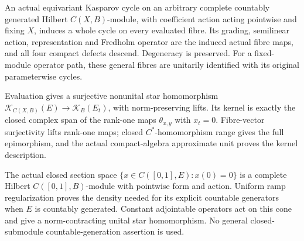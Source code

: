 \begin{proposition}\label{prop:arbitrary-interval-cycle-fibres}
\leanok
An actual equivariant Kasparov cycle on an arbitrary complete countably
generated Hilbert $C(X,B)$-module, with coefficient action acting pointwise
and fixing $X$, induces a whole cycle on every evaluated fibre.
Its grading, semilinear action, representation and Fredholm operator
are the induced actual fibre maps, and all four compact defects descend.
Degeneracy is preserved. For a fixed-module operator path, these general
fibres are unitarily identified with its original parameterwise cycles.
\end{proposition}

\begin{proposition}\label{prop:compact-fibre-epimorphism-and-kernel}
\leanok
Evaluation gives a surjective nonunital star homomorphism
$\mathcal K_{C(X,B)}(E)\to\mathcal K_B(E_t)$, with norm-preserving lifts.
Its kernel is exactly the closed complex span of the rank-one maps
$\theta_{x,y}$ with $x_t=0$. Fibre-vector surjectivity lifts rank-one maps;
closed $C^*$-homomorphism range gives the full epimorphism, and the actual
compact-algebra approximate unit proves the kernel description.
\end{proposition}

\begin{proposition}\label{prop:cone-hilbert-module}
\leanok
The actual closed section space $\{x\in C([0,1],E):x(0)=0\}$ is a complete
Hilbert $C([0,1],B)$-module with pointwise form and action. Uniform ramp
regularization proves the density needed for its explicit countable
generators when $E$ is countably generated. Constant adjointable operators
act on this cone and give a norm-contracting unital star homomorphism.
No general closed-submodule countable-generation assertion is used.
\end{proposition}


